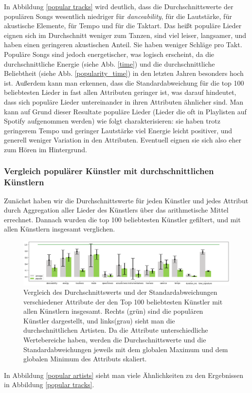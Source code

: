 \documentclass[conference]{IEEEtran}
\begin{document}
In Abbildung \eqref{popular tracks} wird deutlich, dass die Durchschnittswerte der populären Songs wesentlich niedriger für \textit{danceability}, für die Lautstärke, für akustische Elemente, für Tempo und für die Taktart. Das heißt populäre Lieder eignen sich im Durchschnitt weniger zum Tanzen, sind viel leiser, langsamer, und haben einen geringeren akustischen Anteil. Sie haben weniger Schläge pro Takt. Populäre Songs sind jedoch energetischer, was logisch erscheint, da die durchschnittliche Energie (siehe Abb. \eqref{time}) und die durchschnittliche Beliebtheit (siehe Abb. \eqref{popularity_time}) in den letzten Jahren besonders hoch ist.
Außerdem kann man erkennen, dass die Standardabweichung für die top 100 beliebtesten Lieder in fast allen Attributen geringer ist, was darauf hindeutet, dass sich populäre Lieder untereinander in ihren Attributen ähnlicher sind.
Man kann auf Grund dieser Resultate populäre Lieder (Lieder die oft in Playlisten auf Spotify aufgenommen werden) wie folgt charakterisieren: sie haben trotz geringerem Tempo und geringer Lautstärke viel Energie leicht positiver, und generell weniger Variation in den Attributen. Eventuell eignen sie sich also eher zum Hören im Hintergrund. 


\subsubsection{Vergleich populärer Künstler mit durchschnittlichen Künstlern}

Zunächst haben wir die Durchschnittswerte für jeden Künstler und jedes Attribut durch Aggregation aller Lieder des Künstlers über das arithmetische Mittel errechnet. Dannach wurden die top 100 beliebtesten Künstler gefiltert, und mit allen Künstlern insgesamt verglichen.

\begin{figure}[t]
\centering
\includegraphics[width=\textwidth]{images/pop_arts.png}
\caption{Vergleich des Durchschnittswerts und der Standardabweichungen verschiedener Attribute der den Top 100 beliebtesten Künstler mit allen Künstlern insgesamt. Rechts (grün) sind die populären Künstler dargestellt, und links(grau) sieht man die durchschnittlichen Artisten. Da die Attribute unterschiedliche Wertebereiche haben, werden die Durchschnittswerte und die Standardabweichungen jeweils mit dem globalen Maximum und dem globalen Minimum des Attributs skaliert.}
\label{popular artists}
\end{figure}
In Abbildung \eqref{popular artists} sieht man viele Ähnlichkeiten zu den Ergebnissen in Abbildung \eqref{popular tracks}.
\end{document}
